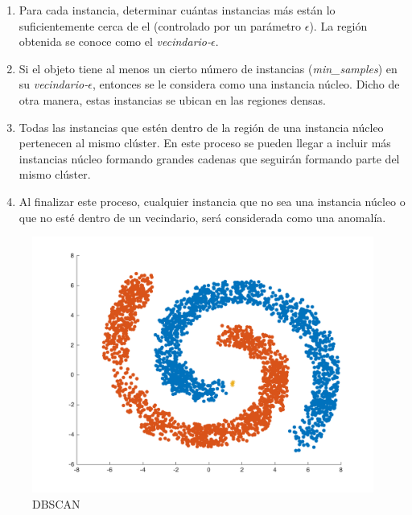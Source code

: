 \documentclass[journal]{IEEEtran}
\begin{document}
                \begin{enumerate}
                    \item Para cada instancia, determinar cuántas instancias más están lo suficientemente cerca de el (controlado por un parámetro $\epsilon$). La región obtenida se conoce como el \emph{vecindario-$\epsilon$}.
                    \item Si el objeto tiene al menos un cierto número de instancias (\emph{min\_samples}) en su \emph{vecindario-$\epsilon$}, entonces se le considera como una instancia núcleo. Dicho de otra manera, estas instancias se ubican en las regiones densas.
                    \item Todas las instancias que estén dentro de la región de una instancia núcleo pertenecen al mismo clúster. En este proceso se pueden llegar a incluir más instancias núcleo formando grandes cadenas que seguirán formando parte del mismo clúster.
                    \item Al finalizar este proceso, cualquier instancia que no sea una instancia núcleo o que no esté dentro de un vecindario, será considerada como una anomalía.
                \end{enumerate}
                
                \begin{figure}[ht]
                    \centering
                    \includegraphics[scale=0.18]{img/dbscan.png}
                    \caption{DBSCAN}
                \end{figure}
            
            \vspace*{2mm}
\end{document}
